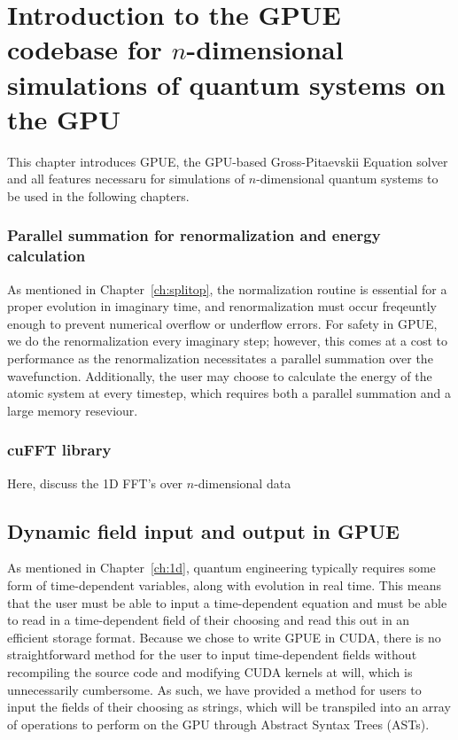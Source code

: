 \chapter{Introduction to the GPUE codebase for $n$-dimensional simulations of quantum systems on the GPU}
\label{ch:gpue}

This chapter introduces GPUE, the GPU-based Gross-Pitaevskii Equation solver and all features necessaru for simulations of $n$-dimensional quantum systems to be used in the following chapters.

\subsection{Parallel summation for renormalization and energy calculation}

As mentioned in Chapter~\ref{ch:splitop}, the normalization routine is essential for a proper evolution in imaginary time, and renormalization must occur freqeuntly enough to prevent numerical overflow or underflow errors.
For safety in GPUE, we do the renormalization every imaginary step; however, this comes at a cost to performance as the renormalization necessitates a parallel summation over the wavefunction.
Additionally, the user may choose to calculate the energy of the atomic system at every timestep, which requires both a parallel summation and a large memory reseviour.


\subsection{cuFFT library}

Here, discuss the 1D FFT's over $n$-dimensional data

\section{Dynamic field input and output in GPUE}

As mentioned in Chapter~\ref{ch:1d}, quantum engineering typically requires some form of time-dependent variables, along with evolution in real time.
This means that the user must be able to input a time-dependent equation and must be able to read in a time-dependent field of their choosing and read this out in an efficient storage format.
Because we chose to write GPUE in CUDA, there is no straightforward method for the user to input time-dependent fields without recompiling the source code and modifying CUDA kernels at will, which is unnecessarily cumbersome.
As such, we have provided a method for users to input the fields of their choosing as strings, which will be transpiled into an array of operations to perform on the GPU through Abstract Syntax Trees (ASTs).

